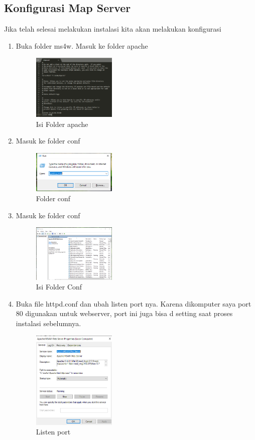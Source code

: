 \subsection{Konfigurasi Map Server}
Jika telah selesai melakukan instalasi kita akan melakukan konfigurasi
\begin{enumerate}
  \item Buka folder ms4w. Masuk ke folder apache
  \hfill\break
    \begin{figure}[H]
		\includegraphics[width=4cm]{figures/1174015/4/No3.png}
		\centering
		\caption{Isi Folder apache}
    \end{figure}


  \item Masuk ke folder conf
  \hfill\break
    \begin{figure}[H]
		\includegraphics[width=4cm]{figures/1174015/4/No4.png}
		\centering
		\caption{Folder conf}
    \end{figure}
  \item Masuk ke folder conf
  \hfill\break
    \begin{figure}[H]
		\includegraphics[width=4cm]{figures/1174015/4/No5.png}
		\centering
		\caption{Isi Folder Conf}
    \end{figure}

  \item Buka file httpd.conf dan ubah listen port nya. Karena dikomputer saya port 80 digunakan untuk webserver, port ini juga bisa d setting saat proses instalasi sebelumnya.
  \hfill\break
    \begin{figure}[H]
		\includegraphics[width=4cm]{figures/1174015/4/No6.png}
		\centering
		\caption{Listen port}
    \end{figure}


\end{enumerate}
